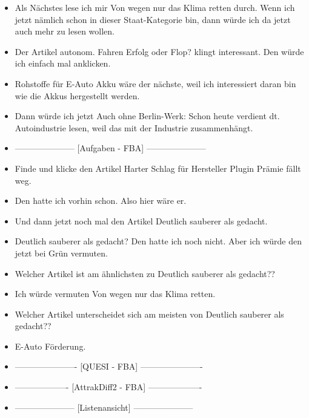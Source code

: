 {\begin{itemize}[]
            \item {} Als Nächstes lese ich mir \flqq Von wegen nur das Klima retten\frqq{} durch.
                  Wenn ich jetzt nämlich schon in dieser Staat-Kategorie bin, dann würde ich da jetzt auch mehr zu lesen wollen.
            \item {} Der Artikel \flqq autonom. Fahren Erfolg oder Flop?\frqq{} klingt interessant.
                  Den würde ich einfach mal anklicken.
            \item {} \flqq Rohstoffe für E-Auto Akku\frqq{} wäre der nächste, weil ich interessiert daran bin wie die Akkus hergestellt werden.
            \item {} Dann würde ich jetzt \flqq Auch ohne Berlin-Werk: Schon heute verdient dt. Autoindustrie\frqq{} lesen, weil das mit der Industrie zusammenhängt.
            \item {---------------------} [Aufgaben - FBA] {---------------------}
            \item {} Finde und klicke den Artikel \flqq Harter Schlag für Hersteller Plugin Prämie fällt weg\frqq{}.
            \item {} Den hatte ich vorhin schon. Also hier wäre er.
            \item {} Und dann jetzt noch mal den Artikel \flqq Deutlich sauberer als gedacht\frqq{}.
            \item {} \flqq Deutlich sauberer als gedacht\frqq{}?
                  Den hatte ich noch nicht.
                  Aber ich würde den jetzt bei Grün vermuten.
            \item {} Welcher Artikel ist am ähnlichsten zu \flqq Deutlich sauberer als gedacht?\frqq{}?
            \item {} Ich würde vermuten \flqq Von wegen nur das Klima retten\frqq{}.
            \item {} Welcher Artikel unterscheidet sich am meisten von \flqq Deutlich sauberer als gedacht?\frqq{}?
            \item {} \flqq E-Auto Förderung\frqq{}.
            \item {----------------------} [QUESI - FBA] {----------------------}
            \item {-------------------} [AttrakDiff2 - FBA] {-------------------}
            \item {---------------------} [Listenansicht] {---------------------}

\end{itemize}}
